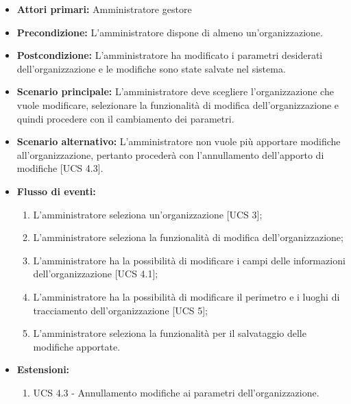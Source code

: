 \begin{itemize}
    \item \textbf{Attori primari:} Amministratore gestore
    \item \textbf{Precondizione:} L'amministratore dispone di almeno un'organizzazione.
    \item \textbf{Postcondizione:} L'amministratore ha modificato i parametri desiderati dell'organizzazione e le modifiche sono state salvate nel sistema.
    \item \textbf{Scenario principale:} L'amministratore deve scegliere l'organizzazione che vuole modificare, selezionare la funzionalità di modifica dell'organizzazione e quindi procedere con il cambiamento dei parametri.
    \item \textbf{Scenario alternativo:} L'amministratore non vuole più apportare modifiche all'organizzazione, pertanto procederà con l'annullamento dell'apporto di modifiche [UCS 4.3].
    \item \textbf{Flusso di eventi:}
    \begin{enumerate}
        \item L'amministratore seleziona un'organizzazione [UCS 3];
        \item L'amministratore seleziona la funzionalità di modifica dell'organizzazione;
        \item L'amministratore ha la possibilità di modificare i campi delle informazioni dell'organizzazione [UCS 4.1];
        \item L'amministratore ha la possibilità di modificare il perimetro e i luoghi di tracciamento dell'organizzazione [UCS 5];
        \item L'amministratore seleziona la funzionalità per il salvataggio delle modifiche apportate.
    \end{enumerate}
    \item \textbf{Estensioni:}
    \begin{enumerate}
        \item UCS 4.3 - Annullamento modifiche ai parametri dell'organizzazione.
    \end{enumerate}
\end{itemize}

